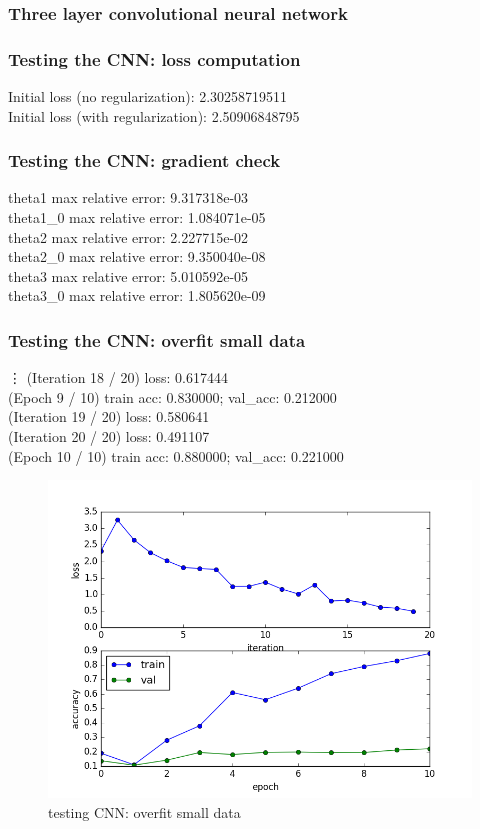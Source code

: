 \documentclass{article}
\begin{document}
\subsubsection{Three layer convolutional neural network}

\subsubsection*{Testing the CNN: loss computation}
{\footnotesize
Initial loss (no regularization):  2.30258719511\\
Initial loss (with regularization):  2.50906848795\\
}

\subsubsection*{Testing the CNN: gradient check}
{\footnotesize
theta1 max relative error: 9.317318e-03\\
theta1\_0 max relative error: 1.084071e-05\\
theta2 max relative error: 2.227715e-02\\
theta2\_0 max relative error: 9.350040e-08\\
theta3 max relative error: 5.010592e-05\\
theta3\_0 max relative error: 1.805620e-09\\
}
\subsubsection*{Testing the CNN: overfit small data}

{\footnotesize
\vdots
(Iteration 18 / 20) loss: 0.617444\\
(Epoch 9 / 10) train acc: 0.830000; val\_acc: 0.212000\\
(Iteration 19 / 20) loss: 0.580641\\
(Iteration 20 / 20) loss: 0.491107\\
(Epoch 10 / 10) train acc: 0.880000; val\_acc: 0.221000\\
}
\begin{figure}[H]
\centering
\includegraphics[width=1.0\linewidth]{./figure_3_2_5}
\caption{testing CNN: overfit small data}
\label{fig:3_2_5}
\end{figure}
\end{document}
